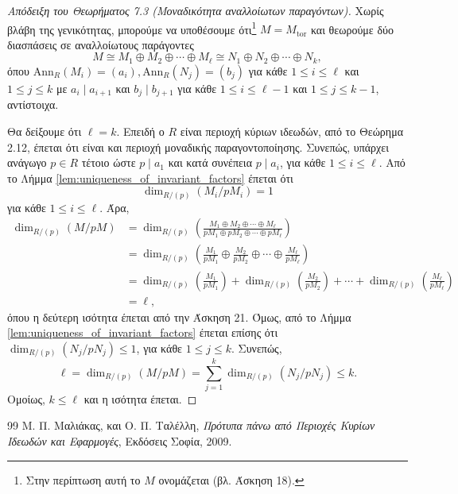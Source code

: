 \documentclass[12pt,a4paper,reqno]{amsart}
\theoremstyle{definition}
\theoremstyle{remark}
\numberwithin{theorem}{section}
\numberwithin{exercise}{section}
\numberwithin{equation}{section}
\newcommand{\Ann}{\mathrm{Ann}}
\newcommand{\tor}{\mathrm{tor}}
\newcommand{\defn}[1]{{\color{mylightblue}{#1}}}
\begin{document}
\begin{proof}[Απόδειξη του Θεωρήματος 7.3 (Μοναδικότητα αναλλοίωτων παραγόντων)]
    Χωρίς βλάβη της γε\-νικότητας, μπορούμε να υποθέσουμε ότι\footnote{Στην περίπτωση αυτή το $M$ ονομάζεται \defn{πρότυπο στρέψης} (βλ. Άσκηση 18).} $M = M_\tor$ και θεωρούμε δύο διασπάσεις σε αναλλοίωτους παράγοντες 
    \[
    M \cong M_1 \oplus M_2 \oplus \cdots \oplus M_\ell \cong N_1 \oplus N_2 \oplus \cdots \oplus N_k,
    \]
    όπου $\Ann_R(M_i) = (a_i), \Ann_R(N_j) = (b_j)$ για κάθε $1 \le i \le \ell$ και $1 \le j \le k$ με $a_i \mid a_{i+1}$ και $b_j \mid b_{j+1}$ για κάθε $1 \le i \le \ell-1$ και $1 \le j \le k-1$, αντίστοιχα.

    Θα δείξουμε ότι $\ell = k$. Επειδή ο $R$ είναι περιοχή κύριων ιδεωδών, από το Θεώρημα 2.12, έπεται ότι είναι και περιοχή μοναδικής παραγοντοποίησης. Συνεπώς, υπάρχει ανάγωγο $p \in R$ τέτοιο ώστε $p \mid a_1$ και κατά συνέπεια $p \mid a_i$, για κάθε $1 \le i \le \ell$. Από το Λήμμα \ref{lem:uniqueness_of_invariant_factors} έπεται ότι 
    \[
    \dim_{R/(p)}\left(
            M_i/pM_i
        \right) = 1
    \]
    για κάθε $1 \le i \le \ell$. Άρα, 
    \begin{align*} 
        \dim_{R/(p)}\left(
            M/pM
        \right) &= 
        \dim_{R/(p)}\left(
            \frac{M_1 \oplus M_2 \oplus \cdots \oplus M_\ell}{pM_1 \oplus pM_2 \oplus \cdots \oplus pM_\ell} 
        \right)\\
        &= 
        \dim_{R/(p)}\left(
            \frac{M_1}{pM_1} \oplus \frac{M_2}{pM_2} \oplus \cdots \oplus \frac{M_\ell}{pM_\ell}
        \right) \\ 
        &= \dim_{R/(p)}\left(
            \frac{M_1}{pM_1}
            \right) + \dim_{R/(p)}\left(
            \frac{M_2}{pM_2}
            \right) + \cdots + \dim_{R/(p)}\left(
            \frac{M_\ell}{pM_\ell}
            \right) \\
        &= \ell,
    \end{align*}
    όπου η δεύτερη ισότητα έπεται από την Άσκηση 21. Όμως, από το Λήμμα \ref{lem:uniqueness_of_invariant_factors} έπεται επίσης ότι 
    $\dim_{R/(p)}\left(
            N_j/pN_j
        \right) \leq 1$, για κάθε $1 \le j \le k$. Συνεπώς, 
    \[
    \ell = \dim_{R/(p)}\left(
            M/pM
        \right) = \sum_{j=1}^k \dim_{R/(p)}\left(
            N_j/pN_j
        \right) \le k.
    \]
    Ομοίως, $k \le \ell$ και η ισότητα έπεται.
\end{proof}


\begin{thebibliography}{99}
    Μ. Π. Μαλιάκας, και Ο. Π. Ταλέλλη, 
    \emph{Πρότυπα πάνω από Περιοχές Κυρίων Ιδεωδών και Εφαρμογές}, 
    Εκδόσεις Σοφία, 2009.
\end{thebibliography}
\end{document}
